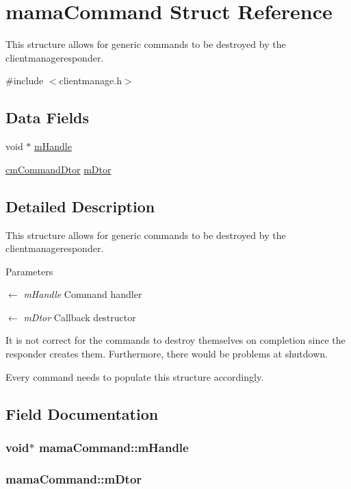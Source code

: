 \hypertarget{structmamaCommand}{
\section{mamaCommand Struct Reference}
\label{structmamaCommand}
}


This structure allows for generic commands to be destroyed by the clientmanageresponder.  


{\ttfamily \#include $<$clientmanage.h$>$}\subsection*{Data Fields}
\begin{DoxyCompactItemize}
\item 
void $\ast$ \hyperlink{structmamaCommand_ada646ff2c915fa9248817c6c9d08bdae}{mHandle}
\item 
\hyperlink{clientmanage_8h_a9ad663611a3dc03e48072379cbff7a95}{cmCommandDtor} \hyperlink{structmamaCommand_a4503f84ad5d6168a979553e19d8902bd}{mDtor}
\end{DoxyCompactItemize}


\subsection{Detailed Description}
This structure allows for generic commands to be destroyed by the clientmanageresponder. 
\begin{DoxyParams}{Parameters}
\item[\mbox{$\leftarrow$} {\em mHandle}]Command handler \item[\mbox{$\leftarrow$} {\em mDtor}]Callback destructor\end{DoxyParams}
It is not correct for the commands to destroy themselves on completion since the responder creates them. Furthermore, there would be problems at shutdown.

Every command needs to populate this structure accordingly. 

\subsection{Field Documentation}
\hypertarget{structmamaCommand_ada646ff2c915fa9248817c6c9d08bdae}{
\subsubsection[{mHandle}]{\setlength{\rightskip}{0pt plus 5cm}void$\ast$ {\bf mamaCommand::mHandle}}}
\label{structmamaCommand_ada646ff2c915fa9248817c6c9d08bdae}
\hypertarget{structmamaCommand_a4503f84ad5d6168a979553e19d8902bd}{
\subsubsection[{mDtor}]{ {\bf mamaCommand::mDtor}}}
\label{structmamaCommand_a4503f84ad5d6168a979553e19d8902bd}
